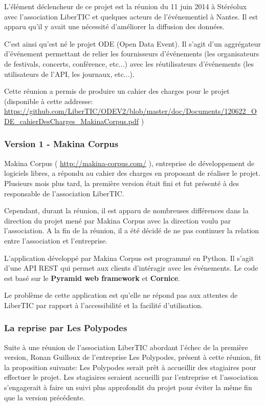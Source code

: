 L'élément déclencheur de ce projet est la réunion du 11 juin 2014 à Stéréolux avec l'association LiberTIC et quelques acteurs de l'événementiel à Nantes. Il est apparu qu'il y avait une nécessité d'améliorer la diffusion des données.

C'est ainsi qu'est né le projet ODE (Open Data Event). Il s'agit d'un aggrégateur d'événement permettant de relier les fournisseurs d'événements (les organisateurs de festivals, concerts, conférence, etc...) avec les réutilisateurs d'événements (les utilisateurs de l'API, les journaux, etc...).

Cette réunion a permis de produire un cahier des charges pour le projet (disponible à cette addresse: \url{https://github.com/LiberTIC/ODEV2/blob/master/doc/Documents/120622_ODE_cahierDesCharges_MakinaCorpus.pdf} )

\subsubsection*{Version 1 - Makina Corpus}

Makina Corpus ( \url{http://makina-corpus.com/} ), entreprise de développement de logiciels libres, a répondu au cahier des charges en proposant de réaliser le projet. Plusieurs mois plus tard, la première version était fini et fut présenté à des responsable de l'association LiberTIC.

Cependant, durant la réunion, il est apparu de nombreuses différences dans la direction du projet mené par Makina Corpus avec la direction voulu par l'association. A la fin de la réunion, il a été décidé de ne pas continuer la relation entre l'association et l'entreprise.

L'application développé par Makina Corpus est programmé en Python. Il s'agit d'une API REST qui permet aux clients d'intéragir avec les événements. Le code est basé sur le \textbf{Pyramid web framework} et \textbf{Cornice}.

Le problème de cette application est qu'elle ne répond pas aux attentes de LiberTIC par rapport à l'accessibilité et la facilité d'utilisation.

\subsubsection*{La reprise par Les Polypodes}

Suite à une réunion de l'association LiberTIC abordant l'échec de la première version, Ronan Guilloux de l'entreprise Les Polypodes, présent à cette réunion, fit la proposition suivante: Les Polypodes serait prêt à accueillir des stagiaires pour effectuer le projet. Les stagiaires seraient accueilli par l'entreprise et l'association s'engagerait à faire un suivi plus approfondit du projet pour éviter la même fin que la version précédente.

